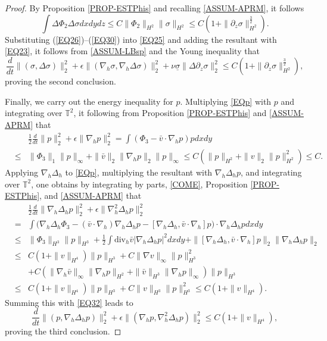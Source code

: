 \documentclass[12pt,reqno]{amsart}
\numberwithin{equation}{section}
\begin{document}
\begin{proof}
By Proposition \ref{PROP-ESTPhis} and recalling \eqref{ASSUM-APRM}, it follows
\begin{equation}
  \int\Delta\Phi_2\Delta\sigma dxdydz\leq C\|\Phi_2\|_{H^2}\|\sigma\|_{H^2}\leq C\left(1+\|\partial_z\sigma\|_{H^2}^\frac32\right). \label{EQ30}
\end{equation}
Substituting (\ref{EQ26})--(\ref{EQ30}) into \eqref{EQ25} and adding the resultant with \eqref{EQ23}, it follows from
\eqref{ASSUM-LBsp} and the Young inequality that
\begin{equation}
  \frac{d}{dt}\|(\sigma,\Delta\sigma)\|_2^2+\epsilon\|(\nabla_h\sigma,\nabla_h\Delta\sigma)\|_2^2
  +\nu\underline\sigma\|\Delta\partial_z\sigma\|_2^2\leq C\left(1+\|\partial_z\sigma\|_{H^2}^\frac32\right), \label{EQ31}
\end{equation}
proving the second conclusion.

Finally, we carry out the energy inequality for $p$. Multiplying \eqref{EQp} with $p$ and integrating over $\mathbb T^2$, it following from
Proposition \ref{PROP-ESTPhis} and \eqref{ASSUM-APRM} that
\begin{eqnarray}
  &&\frac12\frac{d}{dt}\|p\|_2^2+\epsilon\|\nabla_hp\|_2^2= \int(\Phi_3-\bar v\cdot\nabla_hp)pdxdy\nonumber
  \\
  &\leq& \|\Phi_3\|_1\|p\|_\infty+\|\bar v\|_2\|\nabla_hp\|_2\|p\|_\infty\leq C(\|p\|_{H^2}+\|v\|_2\|p\|_{H^2}^2)\leq C.
  \label{EQ32}
\end{eqnarray}
Applying $\nabla_h\Delta_h$ to \eqref{EQp}, multiplying the resultant with $\nabla_h\Delta_hp$, and integrating over $\mathbb T^2$, one
obtains by integrating by parts, \eqref{COME}, Proposition \ref{PROP-ESTPhis}, and \eqref{ASSUM-APRM} that
\begin{eqnarray*}
  &&\frac12\frac{d}{dt}\|\nabla_h\Delta_hp\|_2^2+\epsilon\|\nabla_h^2\Delta_hp\|_2^2\nonumber\\
  &=&\int\Big(\nabla_h\Delta_h\Phi_3-(\bar v\cdot\nabla_h)\nabla_h\Delta_hp-[\nabla_h\Delta_h,\bar v\cdot\nabla_h]p\Big)\cdot\nabla_h\Delta_hpdxdy \nonumber\\
  &\leq&\|\Phi_3\|_{H^3}\|p\|_{H^3}+\frac12\int\text{div}_h\bar v|\nabla_h\Delta_hp|^2dxdy+\|[\nabla_h\Delta_h,\bar v\cdot\nabla_h]p\|_2\|\nabla_h\Delta_h
  p\|_2\nonumber\\
  &\leq&C(1+\|v\|_{H^4})\|p\|_{H^3}+C\|\nabla v\|_\infty\|p\|_{H^3}^2\nonumber\\
  &&+C(\|\nabla_h\bar v\|_\infty\|\nabla_hp\|_{H^2}+\|\bar v\|_{H^3}\|\nabla_hp\|_\infty)\|p\|_{H^3}\nonumber\\
  &\leq&C(1+\|v\|_{H^4})\|p\|_{H^3}+C\|v\|_{H^3}\|p\|_{H^3}^2\leq C(1+\|v\|_{H^4}).
\end{eqnarray*}
Summing this with \eqref{EQ32} leads to
\begin{equation}
  \frac{d}{dt}\|(p,\nabla_h\Delta_hp)\|_2^2+\epsilon\|(\nabla_hp,\nabla_h^2\Delta_hp)\|_2^2
  \leq C(1+\|v\|_{H^4}),\label{EQ33}
\end{equation}
proving the third conclusion.
\end{proof}
\end{document}
